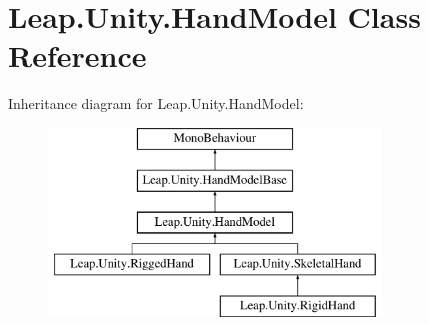 \hypertarget{class_leap_1_1_unity_1_1_hand_model}{}\section{Leap.\+Unity.\+Hand\+Model Class Reference}
\label{class_leap_1_1_unity_1_1_hand_model}
Inheritance diagram for Leap.\+Unity.\+Hand\+Model\+:\begin{figure}[H]
\begin{center}
\leavevmode
\includegraphics[height=5.000000cm]{class_leap_1_1_unity_1_1_hand_model}
\end{center}
\end{figure}
